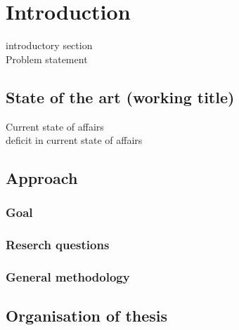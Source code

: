 \chapter{Introduction}
introductory section \\
Problem statement
\section{State of the art (working title)}
Current state of affairs \\
deficit in current state of affairs
\section{Approach}
\subsection{Goal}
\subsection{Reserch questions}
\subsection{General methodology}
\section{Organisation of thesis}
